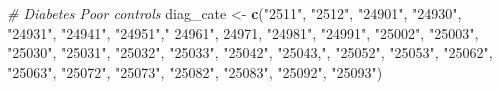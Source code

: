 \documentclass[
]{article}
\newenvironment{Shaded}{\begin{snugshade}}{\end{snugshade}}
\newcommand{\CommentTok}[1]{\textcolor[rgb]{0.56,0.35,0.01}{\textit{#1}}}
\newcommand{\FunctionTok}[1]{\textcolor[rgb]{0.13,0.29,0.53}{\textbf{#1}}}
\newcommand{\NormalTok}[1]{#1}
\newcommand{\OtherTok}[1]{\textcolor[rgb]{0.56,0.35,0.01}{#1}}
\newcommand{\StringTok}[1]{\textcolor[rgb]{0.31,0.60,0.02}{#1}}
\begin{document}
\begin{Shaded}
\begin{Highlighting}[]
\CommentTok{\# Diabetes Poor controls}
\NormalTok{diag\_cate }\OtherTok{\textless{}{-}} \FunctionTok{c}\NormalTok{(}\StringTok{"2511"}\NormalTok{, }\StringTok{"2512"}\NormalTok{, }\StringTok{"24901"}\NormalTok{, }\StringTok{"24930"}\NormalTok{, }\StringTok{"24931"}\NormalTok{, }\StringTok{"24941"}\NormalTok{, }\StringTok{"24951"}\NormalTok{,}\StringTok{" 24961"}\NormalTok{, }\StringTok{\textquotesingle{}24971\textquotesingle{}}\NormalTok{, }\StringTok{"24981"}\NormalTok{, }\StringTok{"24991"}\NormalTok{, }\StringTok{"25002"}\NormalTok{, }\StringTok{"25003"}\NormalTok{, }\StringTok{"25030"}\NormalTok{, }\StringTok{"25031"}\NormalTok{,}
               \StringTok{"25032"}\NormalTok{, }\StringTok{"25033"}\NormalTok{, }\StringTok{"25042"}\NormalTok{, }\StringTok{"25043,"}\NormalTok{, }\StringTok{"25052"}\NormalTok{, }\StringTok{"25053"}\NormalTok{, }\StringTok{"25062"}\NormalTok{, }\StringTok{"25063"}\NormalTok{, }\StringTok{"25072"}\NormalTok{, }\StringTok{"25073"}\NormalTok{, }\StringTok{"25082"}\NormalTok{, }\StringTok{"25083"}\NormalTok{, }\StringTok{"25092"}\NormalTok{, }\StringTok{"25093"}\NormalTok{)}


\end{Highlighting}
\end{Shaded}
\end{document}
